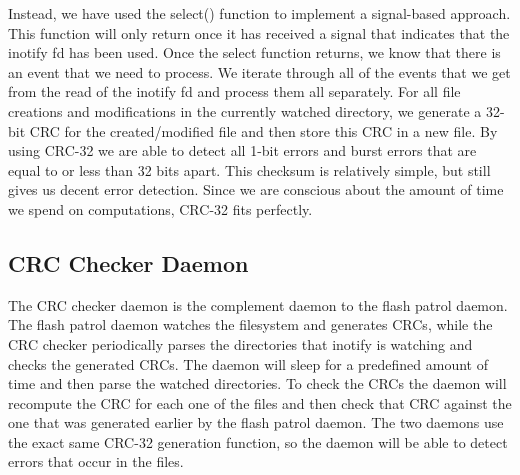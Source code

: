 Instead, we have used the select() function to implement a signal-based approach. This function
will only return once it has received a signal that indicates that the inotify fd has been used.
Once the select function returns, we know that there is an event that we need to process. We iterate
through all of the events that we get from the read of the inotify fd and process them all separately.
For all file creations and modifications in the currently watched directory, we generate a 32-bit CRC 
for the created/modified file and then store this CRC in a new file. By using CRC-32 we are
able to detect all 1-bit errors and burst errors that are equal to or less than 32 bits apart. This checksum is
relatively simple, but still gives us decent error detection. Since we are conscious about the amount
of time we spend on computations, CRC-32 fits perfectly. 

\subsection{CRC Checker Daemon}
The CRC checker daemon is the complement daemon to the flash patrol daemon. The flash
patrol daemon watches the filesystem and generates CRCs, while the CRC checker periodically
parses the directories that inotify is watching and checks the generated CRCs. The daemon will 
sleep for a predefined amount of time and then parse the watched directories. To check the CRCs
the daemon will recompute the CRC for each one of the files and then check that CRC against the
one that was generated earlier by the flash patrol daemon. The two daemons use the exact same
CRC-32 generation function, so the daemon will be able to detect errors that occur in the 
files. 















